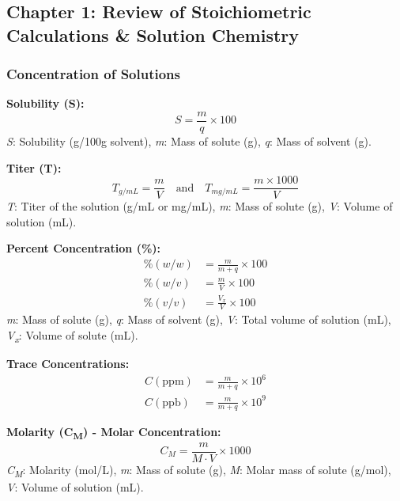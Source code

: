 \subsection*{Chapter 1: Review of Stoichiometric Calculations \& Solution Chemistry}

\subsubsection*{Concentration of Solutions}

\textbf{Solubility (S):}
\begin{equation}
S = \frac{m}{q} \times 100
\end{equation}
\textit{S}: Solubility (g/100g solvent), \textit{m}: Mass of solute (g), \textit{q}: Mass of solvent (g).

\vspace{5mm}
\textbf{Titer (T):}
\begin{equation}
T_{g/mL} = \frac{m}{V} \quad \text{and} \quad T_{mg/mL} = \frac{m \times 1000}{V}
\end{equation}
\textit{T}: Titer of the solution (g/mL or mg/mL), \textit{m}: Mass of solute (g), \textit{V}: Volume of solution (mL).

\vspace{5mm}

\textbf{Percent Concentration (\%):}
\begin{align}
\%(w/w) &= \frac{m}{m+q} \times 100 \\
\%(w/v) &= \frac{m}{V} \times 100 \\
\%(v/v) &= \frac{V_x}{V} \times 100
\end{align}
\textit{m}: Mass of solute (g), \textit{q}: Mass of solvent (g), \textit{V}: Total volume of solution (mL), \textit{V\textsubscript{x}}: Volume of solute (mL).

\vspace{5mm}

\textbf{Trace Concentrations:}
\begin{align}
C(\text{ppm}) &= \frac{m}{m+q} \times 10^6 \\
C(\text{ppb}) &= \frac{m}{m+q} \times 10^9
\end{align}

\textbf{Molarity (C\textsubscript{M}) - Molar Concentration:}
\begin{equation}
C_M = \frac{m}{M \cdot V} \times 1000
\end{equation}
\textit{C\textsubscript{M}}: Molarity (mol/L), \textit{m}: Mass of solute (g), \textit{M}: Molar mass of solute (g/mol), \textit{V}: Volume of solution (mL).

